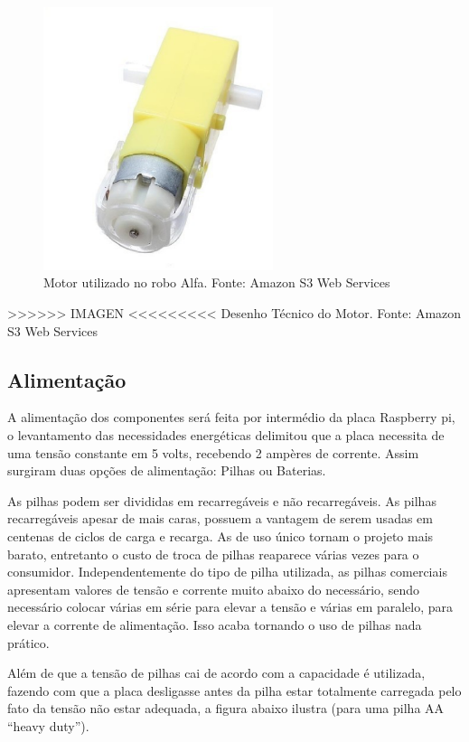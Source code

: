 \begin{figure}[H]
    \centering
    \includegraphics[width=0.6\textwidth]{figuras/motor.eps}
    \caption{Motor utilizado no robo Alfa. Fonte: Amazon S3 Web Services}
    \label{fig:motor}
\end{figure}

>>>>>> IMAGEN <<<<<<<<<
Desenho Técnico do Motor. Fonte: Amazon S3 Web Services

\subsection{Alimentação}

A alimentação dos componentes será feita por intermédio da placa Raspberry pi, o levantamento das necessidades energéticas delimitou
que a placa necessita de uma tensão constante em 5 volts, recebendo 2 ampères de corrente.  Assim surgiram duas opções de
alimentação: Pilhas ou Baterias.

As pilhas podem ser divididas em recarregáveis e não recarregáveis. As pilhas recarregáveis apesar de mais caras, possuem a vantagem de
serem usadas em centenas de ciclos de carga e recarga. As de uso único tornam o projeto mais barato, entretanto o custo de troca de
pilhas reaparece várias vezes para o consumidor. Independentemente do tipo de pilha utilizada, as pilhas comerciais apresentam valores
de tensão e corrente muito abaixo do necessário, sendo necessário colocar várias em série para elevar a tensão e várias em paralelo,
para elevar a corrente de alimentação. Isso acaba tornando o uso de pilhas nada prático.

Além de que a tensão de pilhas cai de acordo com a capacidade é utilizada, fazendo com que a placa desligasse antes da pilha estar
totalmente carregada pelo fato da tensão não estar adequada, a figura abaixo ilustra (para uma pilha AA “heavy duty”).

